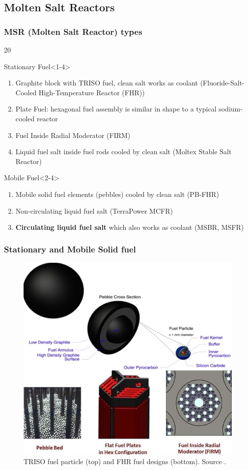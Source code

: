 \subsection{Molten Salt Reactors}

\begin{frame}
\frametitle{MSR (Molten Salt Reactor) types}
\begin{overlayarea}{\linewidth}{20\baselineskip}
\begin{block}{Stationary Fuel}<1-4>
	\begin{enumerate}
		\item Graphite block with TRISO fuel, clean salt works as 
		coolant (Fluoride-Salt-Cooled High-Temperature 
		Reactor (FHR))
		\item Plate Fuel: hexagonal fuel assembly is similar in shape to a typical sodium-cooled reactor
		\item Fuel Inside Radial Moderator (FIRM)
		\item Liquid fuel salt inside fuel rods cooled by clean salt 
		(Moltex Stable Salt Reactor)
	\end{enumerate}
\end{block}

\begin{block}{Mobile Fuel}<2-4>
	\begin{enumerate}
		\item<2-4> Mobile solid fuel elements (pebbles) cooled by 
		clean salt (PB-FHR)
		\item<3-4> Non-circulating liquid fuel salt (TerraPower \gls{MCFR}) 
		\item<4> \textbf{Circulating liquid fuel salt} which also works 
		as coolant (\gls{MSBR}, \gls{MSFR})
	\end{enumerate}
\end{block}
\end{overlayarea}
\end{frame}

\begin{frame}
\frametitle{Stationary and Mobile Solid fuel}
\vspace*{-0.1in}
\begin{figure}[t]
	\hspace*{-0.35in}
	\includegraphics[height=0.63\textwidth]{./images/solid_fuel.jpg}
	\caption{TRISO fuel particle (top) and FHR fuel designs (bottom). Source \cite{forsberg_basis_2016-1}.}
\end{figure}   
\end{frame}

